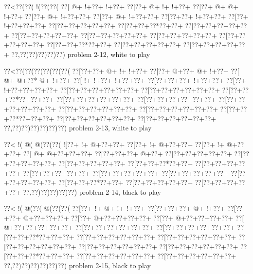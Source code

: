\vbox{\vbox{\goo
\0??<\0??(\0??(\- !(\0??(\0??(
\0??[\- @+\- !+\0??+\- !+\0??+
\0??[\0??+\- @+\- !+\- !+\0??+
\0??[\0??+\- @+\- @+\- !+\0??+
\0??[\0??+\- @+\- !+\0??+\0??+
\0??[\0??+\- @+\- !+\0??+\0??+
\0??[\0??+\0??+\- !+\0??+\0??+
\0??[\0??+\- !+\0??+\0??+\0??+
\0??[\0??+\0??+\0??+\0??+\0??+
\0??[\0??+\0??+\0??*\0??+\0??+
\0??[\0??+\0??+\0??+\0??+\0??+
\0??[\0??+\0??+\0??+\0??+\0??+
\0??[\0??+\0??+\0??+\0??+\0??+
\0??[\0??+\0??+\0??+\0??+\0??+
\0??[\0??+\0??+\0??+\0??+\0??+
\0??[\0??+\0??+\0??*\0??+\0??+
\0??[\0??+\0??+\0??+\0??+\0??+
\0??[\0??+\0??+\0??+\0??+\0??+
\0??,\0??)\0??)\0??)\0??)\0??)
}
\hfil problem 2-12, white to play\hfil\break
}

\vbox{\vbox{\goo
\0??<\0??(\0??(\0??(\0??(\0??(\0??(
\0??[\0??+\0??+\- @+\- !+\- !+\0??+
\0??[\0??+\- @+\0??+\- @+\- !+\0??+
\0??[\- @+\- @+\0??*\- @+\- !+\0??+
\0??[\- !+\- !+\0??+\- !+\0??+\0??+
\0??[\0??+\0??+\0??+\- !+\0??+\0??+
\0??[\0??+\- !+\0??+\0??+\0??+\0??+
\0??[\0??+\0??+\0??+\0??+\0??+\0??+
\0??[\0??+\0??+\0??+\0??+\0??+\0??+
\0??[\0??+\0??+\0??*\0??+\0??+\0??+
\0??[\0??+\0??+\0??+\0??+\0??+\0??+
\0??[\0??+\0??+\0??+\0??+\0??+\0??+
\0??[\0??+\0??+\0??+\0??+\0??+\0??+
\0??[\0??+\0??+\0??+\0??+\0??+\0??+
\0??[\0??+\0??+\0??+\0??+\0??+\0??+
\0??[\0??+\0??+\0??*\0??+\0??+\0??+
\0??[\0??+\0??+\0??+\0??+\0??+\0??+
\0??[\0??+\0??+\0??+\0??+\0??+\0??+
\0??,\0??)\0??)\0??)\0??)\0??)\0??)
}
\hfil problem 2-13, white to play\hfil\break
}

\vbox{\vbox{\goo
\0??<\- !(\- @(\- @(\0??(\0??(
\- ![\0??+\- !+\- @+\0??+\0??+
\0??[\0??+\- !+\- @+\0??+\0??+
\0??[\0??+\- !+\- @+\0??+\0??+
\0??[\- @+\- @+\0??+\0??+\0??+
\0??[\0??+\0??+\0??+\- @+\0??+
\0??[\0??+\0??+\0??+\0??+\0??+
\0??[\0??+\0??+\0??+\0??+\0??+
\0??[\0??+\0??+\0??+\0??+\0??+
\0??[\0??+\0??+\0??*\0??+\0??+
\0??[\0??+\0??+\0??+\0??+\0??+
\0??[\0??+\0??+\0??+\0??+\0??+
\0??[\0??+\0??+\0??+\0??+\0??+
\0??[\0??+\0??+\0??+\0??+\0??+
\0??[\0??+\0??+\0??+\0??+\0??+
\0??[\0??+\0??+\0??*\0??+\0??+
\0??[\0??+\0??+\0??+\0??+\0??+
\0??[\0??+\0??+\0??+\0??+\0??+
\0??,\0??)\0??)\0??)\0??)\0??)
}
\hfil problem 2-14, black to play\hfil\break
}

\vbox{\vbox{\goo
\0??<\- !(\- @(\0??(\- @(\0??(\0??(
\0??[\0??+\- !+\- @+\- !+\- !+\0??+
\0??[\0??+\0??+\0??+\- @+\- !+\0??+
\0??[\0??+\0??+\- @+\0??+\0??+\0??+
\0??[\0??+\- @+\0??+\0??+\0??+\0??+
\0??[\0??+\- @+\0??+\0??+\0??+\0??+
\0??[\- @+\0??+\0??+\0??+\0??+\0??+
\0??[\0??+\0??+\0??+\0??+\0??+\0??+
\0??[\0??+\0??+\0??+\0??+\0??+\0??+
\0??[\0??+\0??+\0??*\0??+\0??+\0??+
\0??[\0??+\0??+\0??+\0??+\0??+\0??+
\0??[\0??+\0??+\0??+\0??+\0??+\0??+
\0??[\0??+\0??+\0??+\0??+\0??+\0??+
\0??[\0??+\0??+\0??+\0??+\0??+\0??+
\0??[\0??+\0??+\0??+\0??+\0??+\0??+
\0??[\0??+\0??+\0??*\0??+\0??+\0??+
\0??[\0??+\0??+\0??+\0??+\0??+\0??+
\0??[\0??+\0??+\0??+\0??+\0??+\0??+
\0??,\0??)\0??)\0??)\0??)\0??)\0??)
}
\hfil problem 2-15, black to play\hfil\break
}

